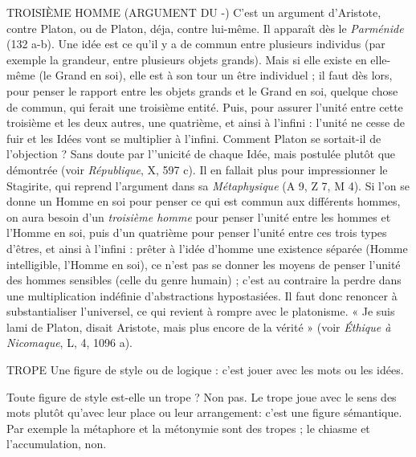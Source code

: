 TROISIÈME HOMME (ARGUMENT DU -) C’est un argument d’Aristote,
contre Platon, ou de
Platon, déja, contre lui-même. Il apparaît dès le {\it Parménide} (132 a-b). Une idée
est ce qu’il y a de commun entre plusieurs individus (par exemple la grandeur,
entre plusieurs objets grands). Mais si elle existe en elle-même (le Grand en soi),
elle est à son tour un être individuel ; il faut dès lors, pour penser le rapport entre
les objets grands et le Grand en soi, quelque chose de commun, qui ferait une
troisième entité. Puis, pour assurer l’unité entre cette troisième et les deux autres,
une quatrième, et ainsi à l'infini : l'unité ne cesse de fuir et les Idées vont se multiplier
à l'infini. Comment Platon se sortait-il de l’objection ? Sans doute par
l’'unicité de chaque Idée, mais postulée plutôt que démontrée (voir {\it République}, X,
597 c). Il en fallait plus pour impressionner le Stagirite, qui reprend l’argument
dans sa {\it Métaphysique} (A 9, Z 7, M 4). Si l’on se donne un Homme en soi pour
penser ce qui est commun aux différents hommes, on aura besoin d’un {\it troisième
homme} pour penser l’unité entre les hommes et l'Homme en soi, puis d’un quatrième
pour penser l’unité entre ces trois types d’êtres, et ainsi à l'infini : prêter à
l’idée d’homme une existence séparée (Homme intelligible, l'Homme en soi), ce
n’est pas se donner les moyens de penser l’unité des hommes sensibles (celle du
genre humain) ; c’est au contraire la perdre dans une multiplication indéfinie
d’abstractions hypostasiées. Il faut donc renoncer à substantialiser l’universel, ce
qui revient à rompre avec le platonisme. « Je suis lami de Platon, disait Aristote,
mais plus encore de la vérité » (voir {\it Éthique à Nicomaque}, L, 4, 1096 a).

TROPE Une figure de style ou de logique : c’est jouer avec les mots ou les
idées.

Toute figure de style est-elle un trope ? Non pas. Le trope joue avec le sens
des mots plutôt qu'avec leur place ou leur arrangement: c’est une figure
sémantique. Par exemple la métaphore et la métonymie sont des tropes ; le
chiasme et l’accumulation, non.

